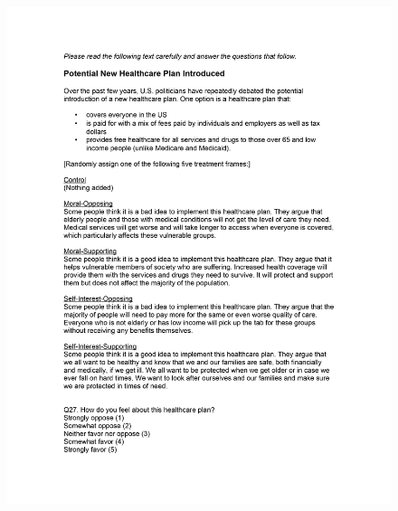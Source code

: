 \documentclass[12pt,econ]{sources/authesis}
\makeatletter
\def\maxwidth{\ifdim\Gin@nat@width>\linewidth\linewidth
\else\Gin@nat@width\fi}
\let\Oldincludegraphics\includegraphics
\renewcommand{\includegraphics}[1]{\Oldincludegraphics[width=\maxwidth]{#1}}
\makeatother
\begin{document}
\begin{figure}[hbt]
  \centering
\includegraphics{data/framing/appendix/questionnaire/questionnaire15.jpg}
\end{figure}
\end{document}
